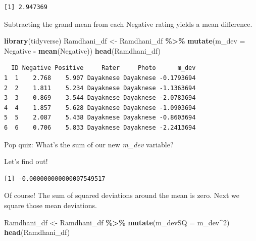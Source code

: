 \documentclass[
  11pt,
]{book}
\newenvironment{Shaded}{\begin{snugshade}}{\end{snugshade}}
\newcommand{\AttributeTok}[1]{\textcolor[rgb]{0.27,0.27,0.27}{#1}}
\newcommand{\DecValTok}[1]{\textcolor[rgb]{0.06,0.06,0.06}{#1}}
\newcommand{\FunctionTok}[1]{\textcolor[rgb]{0.27,0.27,0.27}{\textbf{#1}}}
\newcommand{\NormalTok}[1]{#1}
\newcommand{\OtherTok}[1]{\textcolor[rgb]{0.37,0.37,0.37}{#1}}
\newcommand{\SpecialCharTok}[1]{\textcolor[rgb]{0.43,0.43,0.43}{\textbf{#1}}}
\begin{document}
\begin{verbatim}
[1] 2.947369
\end{verbatim}

Subtracting the grand mean from each Negative rating yields a mean difference.

\begin{Shaded}
\begin{Highlighting}[]
\FunctionTok{library}\NormalTok{(tidyverse)}
\NormalTok{Ramdhani\_df }\OtherTok{\textless{}{-}}\NormalTok{ Ramdhani\_df }\SpecialCharTok{\%\textgreater{}\%}
    \FunctionTok{mutate}\NormalTok{(}\AttributeTok{m\_dev =}\NormalTok{ Negative }\SpecialCharTok{{-}} \FunctionTok{mean}\NormalTok{(Negative))}
\FunctionTok{head}\NormalTok{(Ramdhani\_df)}
\end{Highlighting}
\end{Shaded}

\begin{verbatim}
  ID Negative Positive     Rater     Photo      m_dev
1  1    2.768    5.907 Dayaknese Dayaknese -0.1793694
2  2    1.811    5.234 Dayaknese Dayaknese -1.1363694
3  3    0.869    3.544 Dayaknese Dayaknese -2.0783694
4  4    1.857    5.628 Dayaknese Dayaknese -1.0903694
5  5    2.087    5.438 Dayaknese Dayaknese -0.8603694
6  6    0.706    5.833 Dayaknese Dayaknese -2.2413694
\end{verbatim}

Pop quiz: What's the sum of our new \emph{m\_dev} variable?

Let's find out!

\begin{Shaded}
\end{Shaded}

\begin{verbatim}
[1] -0.000000000000007549517
\end{verbatim}

Of course! The sum of squared deviations around the mean is zero. Next we square those mean deviations.

\begin{Shaded}
\begin{Highlighting}[]
\NormalTok{Ramdhani\_df }\OtherTok{\textless{}{-}}\NormalTok{ Ramdhani\_df }\SpecialCharTok{\%\textgreater{}\%}
    \FunctionTok{mutate}\NormalTok{(}\AttributeTok{m\_devSQ =}\NormalTok{ m\_dev}\SpecialCharTok{\^{}}\DecValTok{2}\NormalTok{)}
\FunctionTok{head}\NormalTok{(Ramdhani\_df)}
\end{Highlighting}
\end{Shaded}
\end{document}
